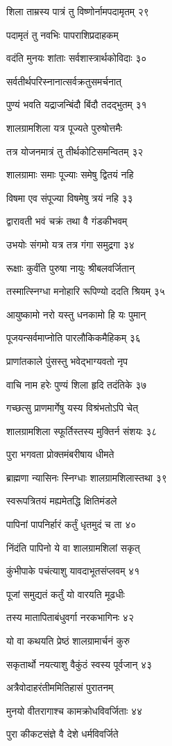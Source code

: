 शिला ताम्रस्य पात्रं तु विष्णोर्नामपदामृतम् २९

पदामृतं तु नवभिः पापराशिप्रदाहकम्

वदंति मुनयः शांताः सर्वशास्त्रार्थकोविदाः ३०

सर्वतीर्थपरिस्नानात्सर्वक्रतुसमर्चनात्

पुण्यं भवति यद्राजन्बिंदौ बिंदौ तदद्भुतम् ३१

शालग्रामशिला यत्र पूज्यते पुरुषोत्तमैः

तत्र योजनमात्रं तु तीर्थकोटिसमन्वितम् ३२

शालग्रामाः समाः पूज्याः समेषु द्वितयं नहि

विषमा एव संपूज्या विषमेषु त्रयं नहि ३३

द्वारावती भवं चक्रं तथा वै गंडकीभवम्

उभयोः संगमो यत्र तत्र गंगा समुद्रगा ३४

रूक्षाः कुर्वंति पुरुषा नायुः श्रीबलवर्जितान्

तस्मात्स्निग्धा मनोहारि रूपिण्यो ददति श्रियम् ३५

आयुष्कामो नरो यस्तु धनकामो हि यः पुमान्

पूजयन्सर्वमाप्नोति पारलौकिकमैहिकम् ३६

प्राणांतकाले पुंसस्तु भवेद्भाग्यवतो नृप

वाचि नाम हरेः पुण्यं शिला हृदि तदंतिके ३७

गच्छत्सु प्राणमार्गेषु यस्य विश्रंभतोऽपि चेत्

शालग्रामशिला स्फूर्तिस्तस्य मुक्तिर्न संशयः ३८

पुरा भगवता प्रोक्तमंबरीषाय धीमते

ब्राह्मणा न्यासिनः स्निग्धाः शालग्रामशिलास्तथा ३९

स्वरूपत्रितयं मह्यमेतद्धि क्षितिमंडले

पापिनां पापनिर्हारं कर्तुं धृतमुदं च ता ४०

निंदंति पापिनो ये वा शालग्रामशिलां सकृत्

कुंभीपाके पचंत्याशु यावदाभूतसंप्लवम् ४१

पूजां समुद्यतं कर्तुं यो वारयति मूढधीः

तस्य मातापिताबंधुवर्गा नरकभागिनः ४२

यो वा कथयति प्रेष्ठं शालग्रामार्चनं कुरु

सकृतार्थो नयत्याशु वैकुंठं स्वस्य पूर्वजान् ४३

अत्रैवोदाहरंतीममितिहासं पुरातनम्

मुनयो वीतरागाश्च कामक्रोधविवर्जिताः ४४

पुरा कीकटसंज्ञे वै देशे धर्मविवर्जिते

